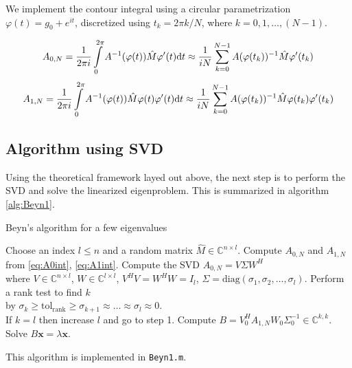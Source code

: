 \documentclass[11pt,letterpaper]{article}
\begin{document}
We implement the contour integral using a circular parametrization $\varphi(t) = g_0 + e^{i t}$, discretized using $t_k = 2\pi k/N$, where $k=0,1,\ldots,(N-1)$. 

\begin{equation}\label{eq:A0int}
A_{0,N} = \frac{1}{2\pi i}\int\limits_{0}^{2\pi} A^{-1}(\varphi(t))\hat{M} \varphi^{\prime}(t)\mathrm{d} t 
\approx \frac{1}{iN}\sum\limits_{k=0}^{N-1}A(\varphi(t_k))^{-1}\hat{M}\varphi^{\prime}(t_k)
\end{equation}
\begin{equation}\label{eq:A1int}
A_{1,N} = \frac{1}{2\pi i}\int\limits_{0}^{2\pi} A^{-1}(\varphi(t))\hat{M} \varphi(t) \varphi^{\prime}(t)\mathrm{d} t
\approx \frac{1}{iN}\sum\limits_{k=0}^{N-1}A(\varphi(t_k))^{-1}\hat{M} \varphi(t_k) \varphi^{\prime}(t_k)
\end{equation}

\subsection{Algorithm using SVD}
Using the theoretical framework layed out above, the next step is to perform the SVD and solve the linearized eigenproblem. This is summarized in algorithm \ref{alg:Beyn1}. 

\begin{algorithm}
\caption{Beyn's algorithm for a few eigenvalues}
\label{alg:Beyn1}
\begin{algorithmic}
\REQUIRE Choose an index $l\leq n$ and a random matrix $\hat{M}\in\mathbb{C}^{n\times l}$. 
\STATE Compute $A_{0,N}$ and $A_{1,N}$ from \ref{eq:A0int}, \ref{eq:A1int}. 
\STATE Compute the SVD $A_{0,N} = V\Sigma W^{H}$ 
\\ \hspace{0.5cm} where $V\in\mathbb{C}^{n\times l}$, $W\in\mathbb{C}^{l\times l}$, $V^{H}V=W^{H}W = I_{l}$, $\Sigma = \mathrm{diag}(\sigma_1,\sigma_2,\ldots,\sigma_l)$.
\STATE Perform a rank test to find $k$ 
\\ \hspace{0.5cm} by $\sigma_k \geq \mathrm{tol_{rank}}\geq \sigma_{k+1} \approx \ldots \approx \sigma_l \approx 0$. 
\\ \hspace{0.5cm} If $k = l$ then increase $l$ and go to step 1. 
\STATE Compute $B = V_0^H A_{1,N} W_0 \Sigma_0^{-1} \in \mathbb{C}^{k,k}$.
\STATE Solve $B\mathbf{x} =\lambda\mathbf{x}$.
\end{algorithmic}
\end{algorithm}
This algorithm is implemented in {\tt Beyn1.m}. 
\end{document}
